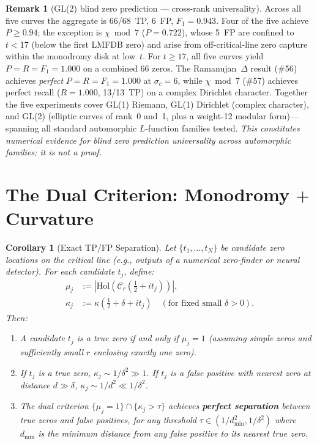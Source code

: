 \documentclass[11pt, a4paper]{article}
\theoremstyle{definition}
\newtheorem{remark}{Remark}[section]
\theoremstyle{plain}
\newtheorem{corollary}[theorem]{Corollary}
\begin{document}
\begin{remark}[GL(2) blind zero prediction --- cross-rank universality]
Across all five curves the aggregate is 66/68~TP, 6~FP,
$F_1 = 0.943$.  Four of the five achieve $P \geq 0.94$;
the exception is $\chi\bmod 7$ ($P = 0.722$), whose 5~FP
are confined to $t < 17$ (below the first LMFDB zero) and
arise from off-critical-line zero capture within the monodromy disk
at low~$t$.  For $t \geq 17$, all five curves yield
$P = R = F_1 = 1.000$ on a combined 66 zeros.
The Ramanujan~$\Delta$ result (\#56) achieves
\emph{perfect} $P = R = F_1 = 1.000$ at $\sigma_c = 6$,
while $\chi\bmod 7$ (\#57) achieves perfect recall ($R = 1.000$,
13/13~TP) on a complex Dirichlet character.
Together the five experiments cover GL(1) Riemann, GL(1) Dirichlet
(complex character), and GL(2) (elliptic curves of rank~0 and~1,
plus a weight-12 modular form)---spanning all standard automorphic
$L$-function families tested.
\emph{This constitutes numerical evidence for blind zero prediction
universality across automorphic families; it is not a proof.}
\end{remark}


\section{The Dual Criterion: Monodromy $+$ Curvature}
\label{sec:dual_criterion_thm}

\begin{corollary}[Exact TP/FP Separation]
\label{cor:dual_criterion}
Let $\{t_1, \ldots, t_N\}$ be candidate zero locations on the critical
line (e.g., outputs of a numerical zero-finder or neural detector).
For each candidate $t_j$, define:
\begin{align}
  \mu_j &:= |\mathrm{Hol}(\mathcal{C}_r(\tfrac{1}{2}+it_j))|,
  \label{eq:mono_criterion}\\
  \kappa_j &:= \kappa(\tfrac{1}{2} + \delta + it_j)
  \quad (\text{for fixed small } \delta > 0).
  \label{eq:kappa_criterion}
\end{align}
Then:
\begin{enumerate}
  \item[\textup{(i)}] A candidate $t_j$ is a true zero if and only if
    $\mu_j = 1$ (assuming simple zeros and sufficiently small $r$
    enclosing exactly one zero).

  \item[\textup{(ii)}] If $t_j$ is a true zero,
    $\kappa_j \sim 1/\delta^2 \gg 1$.
    If $t_j$ is a false positive with nearest zero at distance $d \gg \delta$,
    $\kappa_j \sim 1/d^2 \ll 1/\delta^2$.

  \item[\textup{(iii)}] The dual criterion $\{\mu_j = 1\} \cap
    \{\kappa_j > \tau\}$ achieves \textbf{perfect separation} between
    true zeros and false positives, for any threshold
    $\tau \in (1/d_{\min}^2, 1/\delta^2)$ where $d_{\min}$ is the
    minimum distance from any false positive to its nearest true zero.
\end{enumerate}
\end{corollary}
\end{document}
